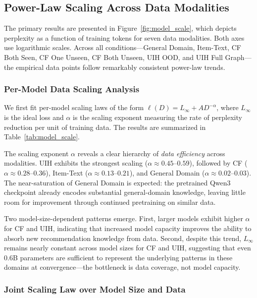\documentclass[]{fairmeta}
\begin{document}
\subsection{Power-Law Scaling Across Data Modalities}
The primary results are presented in Figure~\ref{fig:model_scale}, which depicts perplexity as a function of training tokens for seven data modalities. Both axes use logarithmic scales. Across all conditions—General Domain, Item-Text, CF Both Seen, CF One Unseen, CF Both Unseen, UIH OOD,
  and UIH Full Graph—the empirical data points follow remarkably consistent power-law trends.

  \subsubsection{Per-Model Data Scaling Analysis}

  We first fit per-model scaling laws of the form $\ell(D) = L_\infty + A D^{-\alpha}$, where $L_\infty$ is the ideal loss and $\alpha$ is the scaling exponent measuring the rate of perplexity reduction per unit of training data. The results are summarized in Table~\ref{tab:model_scale}.

  The scaling exponent $\alpha$ reveals a clear hierarchy of \emph{data efficiency} across modalities. UIH exhibits the strongest scaling ($\alpha \approx 0.45$--$0.59$), followed by CF ($\alpha \approx 0.28$--$0.36$), Item-Text ($\alpha \approx 0.13$--$0.21$), and General Domain ($\alpha
  \approx 0.02$--$0.03$). The near-saturation of General Domain is expected: the pretrained Qwen3 checkpoint already encodes substantial general-domain knowledge, leaving little room for improvement through continued pretraining on similar data.

  Two model-size-dependent patterns emerge. First, larger models exhibit higher $\alpha$ for CF and UIH, indicating that increased model capacity improves the ability to absorb new recommendation knowledge from data. Second, despite this trend, $L_\infty$ remains nearly constant across model
  sizes for CF and UIH, suggesting that even 0.6B parameters are sufficient to represent the underlying patterns in these domains at convergence—the bottleneck is data coverage, not model capacity.

  \subsubsection{Joint Scaling Law over Model Size and Data}
\end{document}
